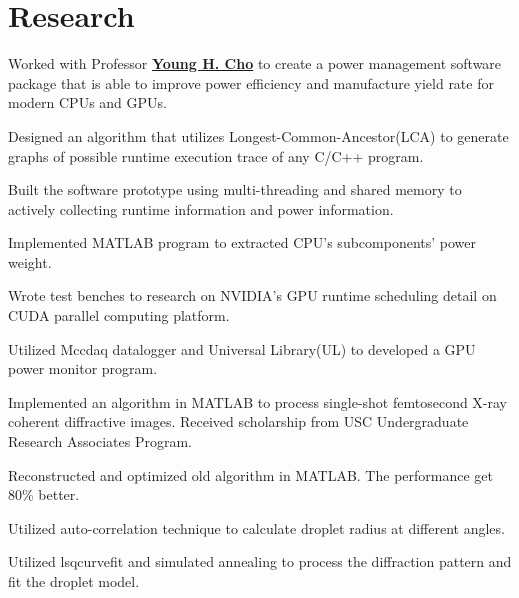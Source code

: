 \documentclass[]{deedy-resume-openfont}
\begin{document}
\begin{minipage}[t]{0.66\textwidth}
\section{Research}
Worked with Professor \textbf{\href{http://oasys.isi.edu/profile.php?id=1}{Young H. Cho}} to create a power management software package that is able to improve power efficiency and manufacture yield rate for modern CPUs and GPUs.
\begin{tightemize}
	\item Designed an algorithm that utilizes Longest-Common-Ancestor(LCA) to generate graphs of possible runtime execution trace of any C/C++ program.
	\item Built the software prototype using multi-threading and shared memory to actively collecting runtime information and power information.
	\item Implemented MATLAB program to extracted CPU's subcomponents' power weight.
	\item Wrote test benches to research on NVIDIA's GPU runtime scheduling detail on CUDA parallel computing platform.
	\item Utilized Mccdaq datalogger and Universal Library(UL) to developed a GPU power monitor program.
\end{tightemize}
\sectionsep

Implemented an algorithm in MATLAB to process single-shot femtosecond X-ray coherent diffractive images. Received scholarship from USC Undergraduate Research Associates Program.
\begin{tightemize}
	\item Reconstructed and optimized old algorithm in MATLAB. The performance get 80\% better.
	\item Utilized auto-correlation technique to calculate droplet radius at different angles.
	\item Utilized lsqcurvefit and simulated annealing to process the diffraction pattern and fit the droplet model.
\end{tightemize}
\sectionsep





\end{minipage} 
\end{document}
